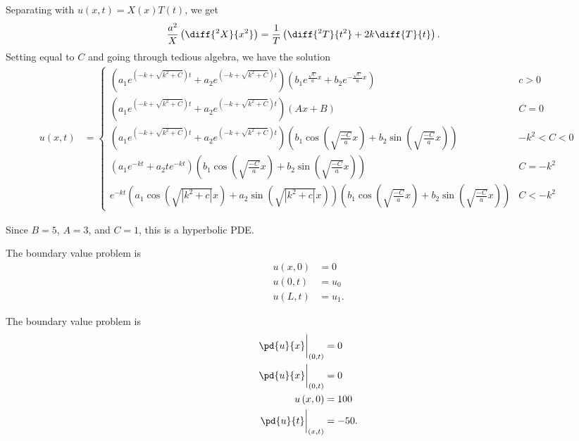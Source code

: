 \documentclass[10pt]{mypackage}
\begin{document}
\begin{solution}[12.1, Problem 12]
  Separating with $u\left( x,t \right) = X(x)T(t)$, we get
  \begin{align*}
    \frac{a^2}{X}\left( \diff{^2X}{x^2} \right) &= \frac{1}{T}\left( \diff{^2T}{t^2} + 2k\diff{T}{t} \right).
  \end{align*}
  Setting equal to $C$ and going through tedious algebra, we have the solution
  \begin{align*}
    u\left( x,t \right) &= \begin{cases}
      \left( a_1e^{\left( -k+\sqrt{k^2 + C} \right)t} + a_2e^{\left( -k+ \sqrt{k^2 + C} \right)t} \right)\left( b_1e^{\frac{\sqrt{C}}{a}x} + b_2e^{-\frac{\sqrt{C}}{a}x} \right) & c > 0\\
      \left( a_1e^{\left( -k+\sqrt{k^2 + C} \right)t} + a_2e^{\left( -k+ \sqrt{k^2 + C} \right)t} \right)\left( Ax + B \right) & C = 0\\
      \left( a_1e^{\left( -k+\sqrt{k^2 + C} \right)t} + a_2e^{\left( -k+ \sqrt{k^2 + C} \right)t} \right)\left( b_1\cos\left( \sqrt{\frac{-C}{a}}x  \right)+ b_2\sin\left( \sqrt{\frac{-C}{a}}x \right) \right) & -k^2 < C < 0\\
      \left( a_1e^{-kt} + a_2te^{-kt} \right)\left( b_1\cos\left( \sqrt{\frac{-C}{a}}x  \right)+ b_2\sin\left( \sqrt{\frac{-C}{a}}x \right) \right) & C = -k^2\\
      e^{-kt}\left( a_1\cos\left( \sqrt{\left\vert k^2 + c \right\vert}x \right) + a_2\sin\left( \sqrt{\left\vert k^2 + c \right\vert}x \right) \right)\left( b_1\cos\left( \sqrt{\frac{-C}{a}}x  \right)+ b_2\sin\left( \sqrt{\frac{-C}{a}}x \right) \right) & C < -k^2
    \end{cases}
  \end{align*}
\end{solution}
\begin{solution}[12.1, Problem 18]
  Since $B = 5$, $A = 3$, and $C = 1$, this is a hyperbolic PDE.
\end{solution}
\begin{solution}[12.2, Problem 2]
  The boundary value problem is
  \begin{align*}
    u\left( x,0 \right) &= 0\\
    u\left( 0,t \right) &= u_0\\
    u\left( L,t \right) &= u_1.
  \end{align*}
\end{solution}
\begin{solution}[12.2, Problem 4]
  The boundary value problem is
  \begin{align*}
    \pd{u}{x}\biggr\vert_{(0,t)} &= 0\\
    \pd{u}{x}\biggr\vert_{(0,t)} &= 0\\
    u\left( x,0 \right) &= 100\\
    \pd{u}{t}\biggr\vert_{(x,t)} &= -50.
  \end{align*}
  
\end{solution}
\end{document}
